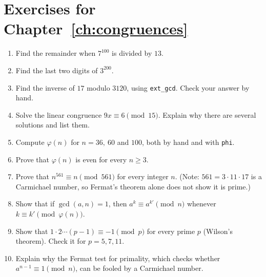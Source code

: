 \section*{Exercises for Chapter~\ref{ch:congruences}}

\begin{enumerate}
  \item Find the remainder when $7^{100}$ is divided by $13$.
  \item Find the last two digits of $3^{200}$.
  \item Find the inverse of $17$ modulo $3120$, using \texttt{ext\_gcd}. Check your answer by hand.
  \item Solve the linear congruence $9x\equiv 6\pmod{15}$. Explain why there are several solutions and list them.
  \item Compute $\varphi(n)$ for $n=36,\ 60$ and $100$, both by hand and with \texttt{phi}.
  \item Prove that $\varphi(n)$ is even for every $n\ge 3$.
  \item Prove that $n^{561}\equiv n\pmod{561}$ for every integer $n$. (Note: $561=3\cdot 11\cdot 17$ is a Carmichael number, so Fermat's theorem alone does not show it is prime.)
  \item Show that if $\gcd(a,n)=1$, then $a^{k}\equiv a^{k'}\pmod n$ whenever $k\equiv k'\pmod{\varphi(n)}$.
  \item Show that $1\cdot 2\cdots (p-1)\equiv -1\pmod p$ for every prime $p$ (Wilson's theorem). Check it for $p=5,7,11$.
  \item Explain why the Fermat test for primality, which checks whether $a^{n-1}\equiv 1\pmod n$, can be fooled by a Carmichael number.
\end{enumerate}
